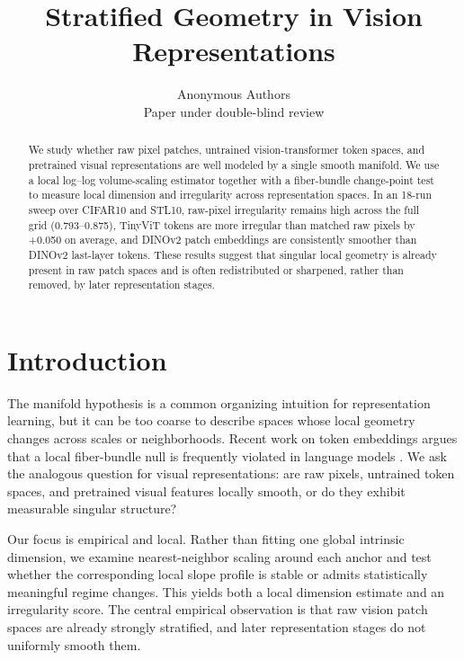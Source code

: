 \documentclass{article}
\title{Stratified Geometry in Vision Representations}
\author{
  Anonymous Authors \\
  Paper under double-blind review
}
\newcommand{\dataset}[1]{\textsc{#1}}
\begin{document}
\maketitle

\begin{abstract}
We study whether raw pixel patches, untrained vision-transformer token spaces, and pretrained visual representations are well modeled by a single smooth manifold. We use a local log--log volume-scaling estimator together with a fiber-bundle change-point test to measure local dimension and irregularity across representation spaces. In an 18-run sweep over \dataset{CIFAR10} and \dataset{STL10}, raw-pixel irregularity remains high across the full grid (0.793--0.875), TinyViT tokens are more irregular than matched raw pixels by +0.050 on average, and DINOv2 patch embeddings are consistently smoother than DINOv2 last-layer tokens. These results suggest that singular local geometry is already present in raw patch spaces and is often redistributed or sharpened, rather than removed, by later representation stages.
\end{abstract}

\section{Introduction}
The manifold hypothesis is a common organizing intuition for representation learning, but it can be too coarse to describe spaces whose local geometry changes across scales or neighborhoods. Recent work on token embeddings argues that a local fiber-bundle null is frequently violated in language models \citep{robinson2025token}. We ask the analogous question for visual representations: are raw pixels, untrained token spaces, and pretrained visual features locally smooth, or do they exhibit measurable singular structure?

Our focus is empirical and local. Rather than fitting one global intrinsic dimension, we examine nearest-neighbor scaling around each anchor and test whether the corresponding local slope profile is stable or admits statistically meaningful regime changes. This yields both a local dimension estimate and an irregularity score. The central empirical observation is that raw vision patch spaces are already strongly stratified, and later representation stages do not uniformly smooth them.
\end{document}

